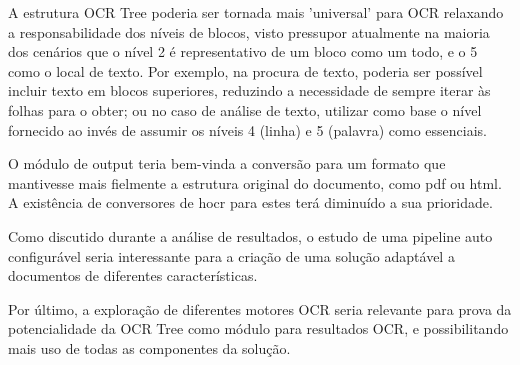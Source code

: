 A estrutura OCR Tree poderia ser tornada mais 'universal' para OCR relaxando a responsabilidade dos níveis de blocos, visto pressupor atualmente na maioria dos cenários que o nível 2 é representativo de um bloco como um todo, e o 5 como o local de texto. Por exemplo, na procura de texto, poderia ser possível incluir texto em blocos superiores, reduzindo a necessidade de sempre iterar às folhas para o obter; ou no caso de análise de texto, utilizar como base o nível fornecido ao invés de assumir os níveis 4 (linha) e 5 (palavra) como essenciais.

O módulo de output teria bem-vinda a conversão para um formato que mantivesse mais fielmente a estrutura original do documento, como pdf ou html. A existência de conversores de hocr para estes terá diminuído a sua prioridade.

Como discutido durante a análise de resultados, o estudo de uma pipeline auto configurável seria interessante para a criação de uma solução adaptável a documentos de diferentes características. 


Por último, a exploração de diferentes motores OCR seria relevante para prova da potencialidade da OCR Tree como módulo para resultados OCR, e possibilitando mais uso de todas as componentes da solução.


		